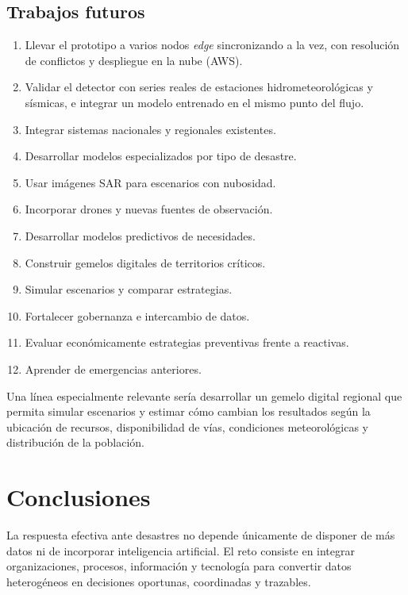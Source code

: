 \documentclass[11pt,a4paper]{article}
\begin{document}
\subsection{Trabajos futuros}

\begin{enumerate}[leftmargin=*]
  \item Llevar el prototipo a varios nodos \emph{edge} sincronizando a la vez,
        con resolución de conflictos y despliegue en la nube (AWS).
  \item Validar el detector con series reales de estaciones hidrometeorológicas
        y sísmicas, e integrar un modelo entrenado en el mismo punto del flujo.
  \item Integrar sistemas nacionales y regionales existentes.
  \item Desarrollar modelos especializados por tipo de desastre.
  \item Usar imágenes SAR para escenarios con nubosidad.
  \item Incorporar drones y nuevas fuentes de observación.
  \item Desarrollar modelos predictivos de necesidades.
  \item Construir gemelos digitales de territorios críticos.
  \item Simular escenarios y comparar estrategias.
  \item Fortalecer gobernanza e intercambio de datos.
  \item Evaluar económicamente estrategias preventivas frente a reactivas.
  \item Aprender de emergencias anteriores.
\end{enumerate}

Una línea especialmente relevante sería desarrollar un gemelo digital regional
que permita simular escenarios y estimar cómo cambian los resultados según la
ubicación de recursos, disponibilidad de vías, condiciones meteorológicas y
distribución de la población.

\section{Conclusiones}

La respuesta efectiva ante desastres no depende únicamente de disponer de más
datos ni de incorporar inteligencia artificial. El reto consiste en integrar
organizaciones, procesos, información y tecnología para convertir datos
heterogéneos en decisiones oportunas, coordinadas y trazables.
\end{document}
